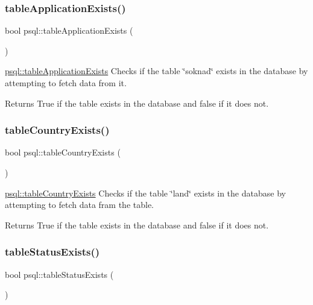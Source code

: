\subsubsection{\texorpdfstring{table\+Application\+Exists()}{tableApplicationExists()}}
{\footnotesize\ttfamily bool psql\+::table\+Application\+Exists (\begin{DoxyParamCaption}{ }\end{DoxyParamCaption})}



\mbox{\hyperlink{classpsql_a117b616053845f1b7295b21a06f008fd}{psql\+::table\+Application\+Exists}} Checks if the table \char`\"{}soknad\char`\"{} exists in the database by attempting to fetch data from it. 

\begin{DoxyReturn}{Returns}
True if the table exists in the database and false if it does not. 
\end{DoxyReturn}
\mbox{\label{classpsql_ae0ab0012c58471bd3fd63c286fb22224}} 
\subsubsection{\texorpdfstring{table\+Country\+Exists()}{tableCountryExists()}}
{\footnotesize\ttfamily bool psql\+::table\+Country\+Exists (\begin{DoxyParamCaption}{ }\end{DoxyParamCaption})}



\mbox{\hyperlink{classpsql_ae0ab0012c58471bd3fd63c286fb22224}{psql\+::table\+Country\+Exists}} Checks if the table \char`\"{}land\char`\"{} exists in the database by attempting to fetch data fram the table. 

\begin{DoxyReturn}{Returns}
True if the table exists in the database and false if it does not. 
\end{DoxyReturn}
\mbox{\label{classpsql_a3f8bac89bd0cee3af77e47e5c555543d}} 
\subsubsection{\texorpdfstring{table\+Status\+Exists()}{tableStatusExists()}}
{\footnotesize\ttfamily bool psql\+::table\+Status\+Exists (\begin{DoxyParamCaption}{ }\end{DoxyParamCaption})}



